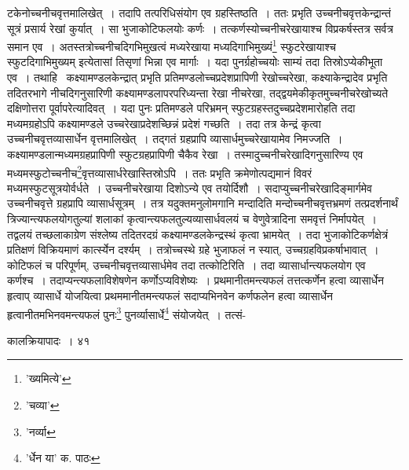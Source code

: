 \documentclass[11pt, openany]{book}
\begin{document}
{{{{{\vspace{0.3cm}
\noindent टकेनोच्चनीचवृत्तमालिखेत्~। तदापि तत्परिधिसंयोग एव ग्रहस्तिष्ठति~। ततः प्रभृति उच्चनीचवृत्तकेन्द्रान्तं सूत्रं प्रसार्य रेखां कुर्यात्~।
सा भुजाकोटिफलयोः कर्णः~। तत्कर्णस्योच्चनीचरेखायाश्च विप्रकर्षस्तत्र सर्वत्र समान एव~। अतस्तत्रोच्चनीचदिगभिमुखत्वं मध्यरेखाया मध्यदिगाभिमुख्यं\renewcommand{\thefootnote}{१}\footnote{'ख्यमित्ये'} स्फुटरेखायाश्च स्फुटदिगाभिमुख्यम् इत्येतासां तिसृणां भिन्ना एव मार्गाः~। यदा पुनर्ग्रहोच्चयोः साम्यं तदा तिस्रोऽप्येकीभूता एव~। तथाहि  \textendash\ कक्ष्यामण्डलकेन्द्रात् प्रभृति प्रतिमण्डलोच्चप्रदेशप्रापिणी रेखोच्चरेखा, कक्ष्याकेन्द्रादेव प्रभृति तदितरभागे नीचदिगनुसारिणी कक्ष्यामण्डलापरपरिध्यन्ता रेखा नीचरेखा, तद्द्वयमेकीकृतमुच्चनीचरेखोच्यते दक्षिणोत्तरा पूर्वापरेत्यादिवत्~। यदा पुनः प्रतिमण्डले परिभ्रमन् स्फुटग्रहस्तदुच्चप्रदेशमारोहति तदा मध्यमग्रहोऽपि कक्ष्यामण्डले उच्चरेखाप्रदेशच्छिन्नं प्रदेशं गच्छति~। तदा तत्र केन्द्रं कृत्वा उच्चनीचवृत्तव्यासार्धेन वृत्तमालिखेत्~। तद्गतं ग्रहप्रापि व्यासार्धमुच्चरेखायामेव निमज्जति~। कक्ष्यामण्डलान्मध्यमग्रहप्रापिणी स्फुटग्रहप्रापिणी चैकैव रेखा~। तस्मादुच्चनीचरेखादिगनुसारिण्य एव मध्यमस्फुटोच्चनीच\renewcommand{\thefootnote}{२}\footnote{'चव्या'}वृत्तव्यासार्धरेखास्तिस्रोऽपि~। ततः प्रभृति क्रमेणोत्पद्यमानं विवरं मध्यमस्फुटसूत्रयोर्वर्धते~। उच्चनीचरेखाया दिशोऽन्ये एव तयोर्दिशौ~। सदाप्युच्चनीचरेखादिङ्मार्गमेव उच्चनीचवृत्ते ग्रहप्रापि व्यासार्धसूत्रम्~। तत्र यदुक्तमनुलोमगानि मन्दादिति मन्दोच्चनीचवृत्तभ्रमणं तत्प्रदर्शनार्थं त्रिज्यान्त्यफलयोगतुल्यां शलाकां कृत्वान्त्यफलतुल्यव्यासार्धवलयं च वेणुवेत्रादिना समवृत्तं निर्मापयेत्~। तद्वलयं तच्छलाकाग्रेण संश्लेष्य तदितरदग्रं कक्ष्यामण्डलकेन्द्रस्थं
कृत्वा भ्रामयेत्~। तदा भुजाकोटिकर्णक्षेत्रं प्रतिक्षणं विक्रियमाणं कार्त्स्येन दर्श्यम्~। तत्रोच्चस्थे ग्रहे भुजाफलं न स्यात्, उच्चग्रहविप्रकर्षाभावात्~। कोटिफलं च परिपूर्णम्, उच्चनीचवृत्तव्यासार्धमेव तदा तत्कोटिरिति~। तदा व्यासार्धान्त्यफलयोग एव कर्णश्च~। तदाप्यन्त्यफलाविशेषणेन कर्णोऽप्यविशेष्यः~। प्रथमानीतमन्त्यफलं तत्तत्कर्णेन हत्वा व्यासार्धेन हृत्वाप् व्यासार्धे योजयित्वा प्रथममानीतमन्त्यफलं सदाप्यभिनवेन कर्णफलेन हत्वा व्यासार्धेन हृत्वानीतमभिनवमन्त्यफलं पुनः\renewcommand{\thefootnote}{३}\footnote{'नर्व्या}  पुनर्व्यासार्धे\renewcommand{\thefootnote}{४}\footnote{'र्धेन या' क. पाठः} संयोजयेत्~। तत्सं-

\newpage

\vspace{3cm} \hspace{4cm}कालक्रियापादः~। \hspace{4cm}४१

}}}}}
\end{document}
